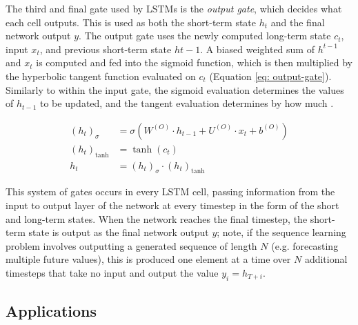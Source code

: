 \documentclass[a4paper, 11pt]{report}
\begin{document}
    The third and final gate used by LSTMs is the \emph{output gate}, which decides what each cell outputs. This is used as both the short-term state $h_t$ and the final network output $y$. The output gate uses the newly computed long-term state $c_t$, input $x_t$, and previous short-term state $h{t-1}$. A biased weighted sum of $h^{t-1}$ and $x_t$ is computed and fed into the sigmoid function, which is then multiplied by the hyperbolic tangent function evaluated on $c_t$ (Equation \ref{eq: output-gate}). Similarly to within the input gate, the sigmoid evaluation determines the values of $h_{t-1}$ to be updated, and the tangent evaluation determines by how much \citep{zhang-2021}.

    \begin{align}
        \label{eq: output-gate}
        (h_t)_{\sigma} &= \sigma( W^{(O)} \cdot h_{t-1} + U^{(O)} \cdot x_t + b^{(O)} ) \\
        (h_t)_{\tanh} &= \tanh{( c_t )} \\
        h_t &= (h_t)_{\sigma} \cdot (h_t)_{\tanh}
    \end{align}

    This system of gates occurs in every LSTM cell, passing information from the input to output layer of the network at every timestep in the form of the short and long-term states. When the network reaches the final timestep, the short-term state is output as the final network output $y$; note, if the sequence learning problem involves outputting a generated sequence of length $N$ (e.g. forecasting multiple future values), this is produced one element at a time over $N$ additional timesteps that take no input and output the value $y_i = h_{T+i}$.


    \subsection{Applications}
\end{document}
